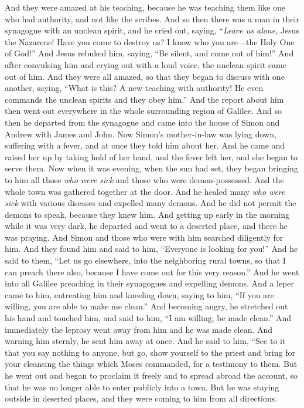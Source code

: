 \begin{biblechapter}
 And they were amazed at his teaching, because he was teaching them like one who had authority, and not like the scribes.
\verse And so then there was a man in their synagogue with an unclean spirit, and he cried out,
\verse saying, “\textit{Leave us alone}, Jesus the Nazarene! Have you come to destroy us? I know who you are—the Holy One of God!”
\verse And Jesus rebuked him, saying, “Be silent, and come out of him!”
\verse And after convulsing him and crying out with a loud voice, the unclean spirit came out of him.
\verse And they were all amazed, so that they began to discuss with one another, saying, “What is this? A new teaching with authority! He even commands the unclean spirits and they obey him.”
\verse And the report about him then went out everywhere in the whole surrounding region of Galilee.
 And so then he departed from the synagogue and came into the house of Simon and Andrew with James and John.
\verse Now Simon’s mother-in-law was lying down, suffering with a fever, and at once they told him about her.
\verse And he came and raised her up by taking hold of her hand, and the fever left her, and she began to serve them.
\verse Now when it was evening, when the sun had set, they began bringing to him all those \textit{who were sick} and those who were demon-possessed.
\verse And the whole town was gathered together at the door.
\verse And he healed many \textit{who were sick} with various diseases and expelled many demons. And he did not permit the demons to speak, because they knew him.
 And getting up early in the morning while it was very dark, he departed and went to a deserted place, and there he was praying.
\verse And Simon and those who were with him searched diligently for him.
\verse And they found him and said to him, “Everyone is looking for you!”
\verse And he said to them, “Let us go elsewhere, into the neighboring rural towns, so that I can preach there also, because I have come out for this very reason.”
\verse And he went into all Galilee preaching in their synagogues and expelling demons.
 And a leper came to him, entreating him and kneeling down, saying to him, “If you are willing, you are able to make me clean.”
\verse And becoming angry, he stretched out his hand and touched him, and said to him, “I am willing; be made clean.”
\verse And immediately the leprosy went away from him and he was made clean.
\verse And warning him sternly, he sent him away at once.
\verse And he said to him, “See to it that you say nothing to anyone, but go, show yourself to the priest and bring for your cleansing the things which Moses commanded, for a testimony to them.
\verse But he went out and began to proclaim it freely and to spread abroad the account, so that he was no longer able to enter publicly into a town. But he was staying outside in deserted places, and they were coming to him from all directions.
\end{biblechapter}

